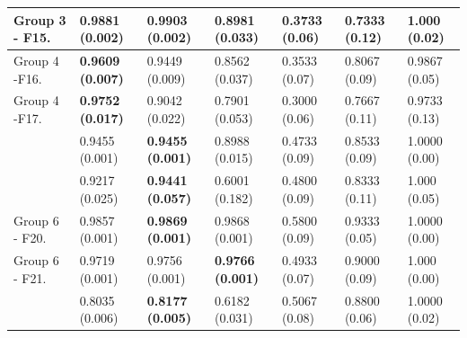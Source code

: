 \begin{center}
\begin{table}[!t]
\begin{tabular}{ccccccc}
		 \multicolumn{1}{|l|}{Group 3 - F15.}           & \multicolumn{1}{l}{0.9881 (0.002)} & \multicolumn{1}{l}{\textbf{0.9903 (0.002)}} & \multicolumn{1}{l|}{0.8981 (0.033)}  	& \multicolumn{1}{l}{0.3733 (0.06)} & \multicolumn{1}{l}{0.7333 (0.12)} & \multicolumn{1}{l|}{1.000 (0.02)}  \\ \hline
		\multicolumn{1}{|l|}{Group 4 -F16.}              & \multicolumn{1}{l}{\textbf{0.9609 (0.007)}} & \multicolumn{1}{l}{0.9449 (0.009)} & \multicolumn{1}{l|}{0.8562 (0.037)}  		& \multicolumn{1}{l}{0.3533 (0.07)} & \multicolumn{1}{l}{0.8067 (0.09)} & \multicolumn{1}{l|}{0.9867 (0.05)}  \\ \hline
		\multicolumn{1}{|l|}{Group 4 -F17.}           & \multicolumn{1}{l}{\textbf{0.9752 (0.017)}} & \multicolumn{1}{l}{0.9042 (0.022)} & \multicolumn{1}{l|}{0.7901 (0.053)}  	& \multicolumn{1}{l}{0.3000 (0.06)} & \multicolumn{1}{l}{0.7667 (0.11)} & \multicolumn{1}{l|}{0.9733 (0.13)}  \\ \hline
		\rowcolor[gray]{.85} \multicolumn{1}{|l|}{Group 5 - F18.}              & \multicolumn{1}{l}{0.9455 (0.001)} & \multicolumn{1}{l}{\textbf{0.9455 (0.001)}} & \multicolumn{1}{l|}{0.8988 (0.015)}  		& \multicolumn{1}{l}{0.4733 (0.09)} & \multicolumn{1}{l}{0.8533 (0.09)} & \multicolumn{1}{l|}{1.0000 (0.00)}  \\ \hline
		\rowcolor[gray]{.85} \multicolumn{1}{|l|}{Group 5 - F19.}           & \multicolumn{1}{l}{0.9217 (0.025)} & \multicolumn{1}{l}{\textbf{0.9441 (0.057)}} & \multicolumn{1}{l|}{0.6001 (0.182)}  	& \multicolumn{1}{l}{0.4800 (0.09)} & \multicolumn{1}{l}{0.8333 (0.11)} & \multicolumn{1}{l|}{1.000 (0.05)}  \\ \hline
		 \multicolumn{1}{|l|}{Group 6 - F20.}              & \multicolumn{1}{l}{0.9857 (0.001)} & \multicolumn{1}{l}{\textbf{0.9869 (0.001)}} & \multicolumn{1}{l|}{0.9868 (0.001)}  		& \multicolumn{1}{l}{0.5800 (0.09)} & \multicolumn{1}{l}{0.9333 (0.05)} & \multicolumn{1}{l|}{1.0000 (0.00)}  \\ \hline
		\multicolumn{1}{|l|}{Group 6 - F21.}           & \multicolumn{1}{l}{0.9719 (0.001)} & \multicolumn{1}{l}{0.9756 (0.001)} & \multicolumn{1}{l|}{\textbf{0.9766 (0.001)}}  	& \multicolumn{1}{l}{0.4933 (0.07)} & \multicolumn{1}{l}{0.9000 (0.09)} & \multicolumn{1}{l|}{1.000 (0.00)}  \\ \hline
		 \rowcolor[gray]{.85} \multicolumn{1}{|l|}{Group 7 - F22.}              & \multicolumn{1}{l}{0.8035 (0.006)} & \multicolumn{1}{l}{\textbf{0.8177 (0.005)}} & \multicolumn{1}{l|}{0.6182 (0.031)}  		& \multicolumn{1}{l}{0.5067 (0.08)} & \multicolumn{1}{l}{0.8800 (0.06)} & \multicolumn{1}{l|}{1.0000 (0.02)}  \\ \hline

\end{tabular}
\end{table}
\end{center}
